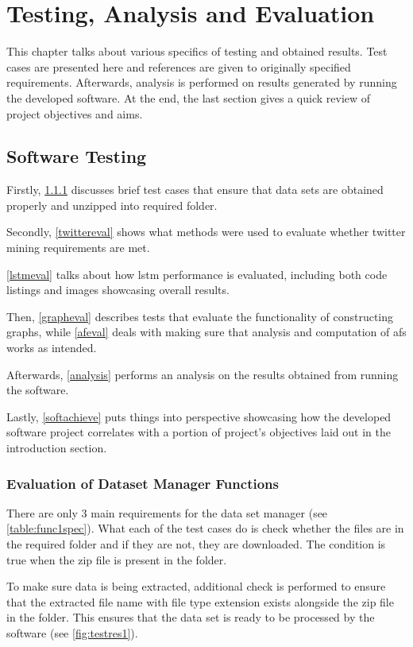 \section{Testing, Analysis and Evaluation}
    This chapter talks about various specifics of testing and obtained results. Test cases are presented here and references are given to originally specified requirements. Afterwards, analysis is performed on results generated by running the developed software. At the end, the last section gives a quick review of project objectives and aims.
    
    \subsection{Software Testing}
        Firstly, \cref{dataeval} discusses brief test cases that ensure that data sets are obtained properly and unzipped into required folder.
        
        Secondly, \cref{twittereval} shows what methods were used to evaluate whether twitter mining requirements are met.
        
        \cref{lstmeval} talks about how \gls{lstm} performance is evaluated, including both code listings and images showcasing overall results.
        
        Then, \cref{grapheval} describes tests that evaluate the functionality of constructing graphs, while \cref{afeval} deals with making sure that analysis and computation of \gls{af}s works as intended.
        
        Afterwards, \cref{analysis} performs an analysis on the results obtained from running the software.
        
        Lastly, \cref{softachieve} puts things into perspective showcasing how the developed software project correlates with a portion of project's objectives laid out in the introduction section.
    
        \subsubsection{Evaluation of Dataset Manager Functions} \label{dataeval}
            There are only 3 main requirements for the data set manager (see \cref{table:func1spec}). What each of the test cases do is check whether the files are in the required folder and if they are not, they are downloaded. The condition is true when the zip file is present in the folder.
            
            To make sure data is being extracted, additional check is performed to ensure that the extracted file name with file type extension exists alongside the zip file in the folder. This ensures that the data set is ready to be processed by the software (see \cref{fig:testres1}).
            

